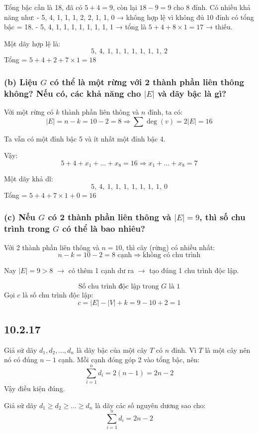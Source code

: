\documentclass{article}
\begin{document}
	Tổng bậc cần là 18, đã có \(5 + 4 = 9\), còn lại \(18 - 9 = 9\) cho 8 đỉnh.  
	Có nhiều khả năng như:
	- 5, 4, 1, 1, 1, 2, 2, 1, 1, 0 → không hợp lệ vì không đủ 10 đỉnh có tổng bậc = 18.
	- 5, 4, 1, 1, 1, 1, 1, 1, 1, 1 → tổng là \(5 + 4 + 8 \times 1 = 17\) → thiếu.
	
	Một dãy hợp lệ là:
	\[
	\boxed{5,\ 4,\ 1,\ 1,\ 1,\ 1,\ 1,\ 1,\ 1,\ 2}
	\]
	Tổng = \(5 + 4 + 2 + 7 \times 1 = 18\)
	
	\subsubsection*{(b) Liệu $G$ có thể là một rừng với 2 thành phần liên thông không? Nếu có, các khả năng cho $|E|$ và dãy bậc là gì?}
	Với một rừng có $k$ thành phần liên thông và $n$ đỉnh, ta có:
	\[
	|E| = n - k = 10 - 2 = 8
	\Rightarrow \sum \deg(v) = 2|E| = 16
	\]
	
	Ta vẫn có một đỉnh bậc 5 và ít nhất một đỉnh bậc 4.
	
	Vậy:
	\[
	5 + 4 + x_1 + \dots + x_8 = 16
	\Rightarrow x_1 + \dots + x_8 = 7
	\]
	
	Một dãy khả dĩ:
	\[
	\boxed{5,\ 4,\ 1,\ 1,\ 1,\ 1,\ 1,\ 1,\ 1,\ 0}
	\]
	Tổng = \(5 + 4 + 7 \times 1 + 0 = 16\)
	
	\subsubsection*{(c) Nếu $G$ có 2 thành phần liên thông và $|E| = 9$, thì số chu trình trong $G$ có thể là bao nhiêu?}
	Với 2 thành phần liên thông và $n = 10$, thì cây (rừng) có nhiều nhất:
	\[
	n - k = 10 - 2 = 8 \text{ cạnh} \Rightarrow \text{không có chu trình}
	\]
	
	Nay $|E| = 9 > 8$ $\rightarrow$ có thêm 1 cạnh dư ra $\rightarrow$ tạo đúng 1 chu trình độc lập.
	
	\[
	\boxed{\text{Số chu trình độc lập trong } G \text{ là } 1}
	\]
	Gọi $c$ là số chu trình độc lập:
	\[
	c = |E| - |V| + k = 9 - 10 + 2 = \boxed{1}
	\]
	
	\subsection*{10.2.17}
	Giả sử dãy $d_1, d_2, \dots, d_n$ là dãy bậc của một cây $T$ có $n$ đỉnh.  
	Vì $T$ là một cây nên nó có đúng $n - 1$ cạnh.  
	Mỗi cạnh đóng góp 2 vào tổng bậc, nên:
	\[
	\sum_{i=1}^{n} d_i = 2(n - 1) = 2n - 2
	\]
	Vậy điều kiện đúng.
	
	\vspace{1em}
	Giả sử dãy $d_1 \geq d_2 \geq \dots \geq d_n$ là dãy các số nguyên dương sao cho:
	\[
	\sum_{i=1}^{n} d_i = 2n - 2
	\]
	
\end{document}
